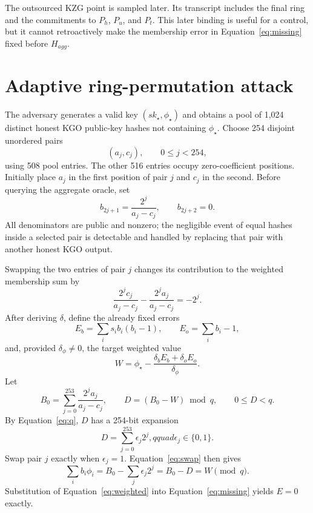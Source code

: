 \documentclass[10pt,a4paper]{article}
\begin{document}
The outsourced KZG point is sampled later. Its transcript includes the final
ring and the commitments to $P_h$, $P_u$, and $P_t$. This later binding is
useful for a control, but it cannot retroactively make the membership error in
Equation~\eqref{eq:missing} fixed before $H_{agg}$.

\section{Adaptive ring-permutation attack}

The adversary generates a valid key $(sk_\star,\phi_\star)$ and obtains a
pool of 1,024 distinct honest KGO public-key hashes not containing
$\phi_\star$. Choose 254 disjoint unordered pairs
\[
(a_j,c_j),\qquad 0\leq j<254,
\]
using 508 pool entries. The other 516 entries occupy zero-coefficient
positions. Initially place $a_j$ in the first position of pair $j$ and $c_j$
in the second. Before querying the aggregate oracle, set
\begin{equation}\label{eq:bpair}
b_{2j+1}=\frac{2^j}{a_j-c_j},\qquad b_{2j+2}=0.
\end{equation}
All denominators are public and nonzero; the negligible event of equal hashes
inside a selected pair is detectable and handled by replacing that pair with
another honest KGO output.

Swapping the two entries of pair $j$ changes its contribution to the weighted
membership sum by
\begin{equation}\label{eq:swap}
\frac{2^j c_j}{a_j-c_j}-\frac{2^j a_j}{a_j-c_j}=-2^j.
\end{equation}
After deriving $\delta$, define the already fixed errors
\begin{equation}
E_b=\sum_i s_i b_i(b_i-1),\qquad E_o=\sum_i b_i-1,
\end{equation}
and, provided $\delta_\phi\neq0$, the target weighted value
\begin{equation}\label{eq:W}
W=\phi_\star-\frac{\delta_bE_b+\delta_oE_o}{\delta_\phi}.
\end{equation}
Let
\begin{equation}
B_0=\sum_{j=0}^{253}\frac{2^j a_j}{a_j-c_j},
\qquad D=(B_0-W)\bmod q,\qquad 0\leq D<q.
\end{equation}
By Equation~\eqref{eq:q}, $D$ has a 254-bit expansion
\[
D=\sum_{j=0}^{253}\epsilon_j2^j,qquad\epsilon_j\in\{0,1\}.
\]
Swap pair $j$ exactly when $\epsilon_j=1$. Equation~\eqref{eq:swap} then
gives
\begin{equation}\label{eq:weighted}
\sum_i b_i\phi_i=B_0-\sum_j\epsilon_j2^j=B_0-D=W\pmod q.
\end{equation}
Substitution of Equation~\eqref{eq:weighted} into
Equation~\eqref{eq:missing} yields $E=0$ exactly.
\end{document}
